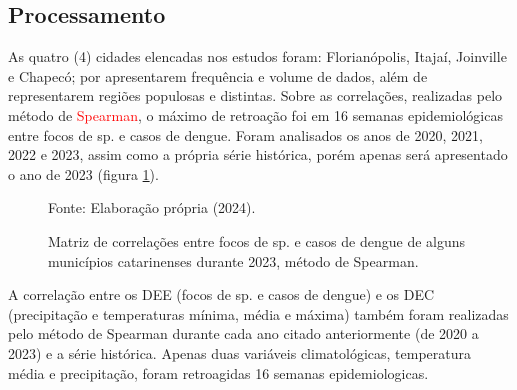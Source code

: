 \documentclass[
	12pt,				%
	openright,			%
	oneside,			%
	a4paper,			%
	english,			%
	french,				%
	spanish,			%
	brazil				%
	dvipsnames, table]{abntex2}
\begin{document}
\subsection{Processamento}

\indent As quatro (4) cidades elencadas nos estudos foram: Florianópolis, Itajaí, Joinville e Chapecó; por apresentarem frequência e volume de dados, além de representarem regiões populosas e distintas. Sobre as correlações, realizadas pelo método de \textcolor{red}{Spearman}, o máximo de retroação foi em 16 semanas epidemiológicas entre focos de  sp. e casos de dengue. Foram analisados os anos de 2020, 2021, 2022 e 2023, assim como a própria série histórica, porém apenas será apresentado o ano de 2023 (figura \ref{fig: matriz_corr_DEE}).

\begin{figure}[htbp]
    \centering
    \caption{Matriz de correlações entre focos de  sp. e casos de dengue de alguns municípios catarinenses durante 2023, método de Spearman.}
    \label{fig: matriz_corr_DEE}
    \hfill
    \hfill
    \small{Fonte: Elaboração própria (2024).}
\end{figure}

\indent A correlação entre os \acrshort{DEE} (focos de  sp. e casos de dengue) e os \acrshort{DEC} (precipitação e temperaturas mínima, média e máxima) também foram realizadas pelo método de Spearman durante cada ano citado anteriormente (de 2020 a 2023) e a série histórica. Apenas duas variáveis climatológicas, temperatura média e precipitação, foram retroagidas 16 semanas epidemiologicas.
\end{document}
